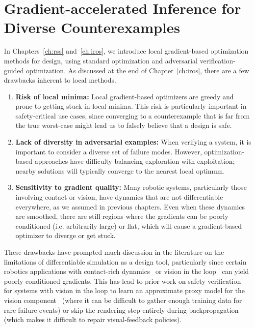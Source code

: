\chapter{Gradient-accelerated Inference for Diverse Counterexamples}\label{ch:corl}

In Chapters~\ref{ch:rss} and~\ref{ch:iros}, we introduce local gradient-based optimization methods for design, using standard optimization and adversarial verification-guided optimization. As discussed at the end of Chapter~\ref{ch:iros}, there are a few drawbacks inherent to local methods.

\begin{enumerate}
    \item \textbf{Risk of local minima: } Local gradient-based optimizers are greedy and prone to getting stuck in local minima. This risk is particularly important in safety-critical use cases, since converging to a counterexample that is far from the true worst-case might lead us to falsely believe that a design is safe.
    \item \textbf{Lack of diversity in adversarial examples: } When verifying a system, it is important to consider a diverse set of failure modes. However, optimization-based approaches have difficulty balancing exploration with exploitation; nearby solutions will typically converge to the nearest local optimum.
    \item \textbf{Sensitivity to gradient quality: } Many robotic systems, particularly those involving contact or vision, have dynamics that are not differentiable everywhere, as we assumed in previous chapters. Even when these dynamics are smoothed, there are still regions where the gradients can be poorly conditioned (i.e. arbitrarily large) or flat, which will cause a gradient-based optimizer to diverge or get stuck.
\end{enumerate}

These drawbacks have prompted much discussion in the literature on the limitations of differentiable simulation as a design tool, particularly since certain robotics applications with contact-rich dynamics~\cite{suhDifferentiableSimulatorsGive2022,metzGradientsAreNot2022} or vision in the loop~\cite{zhaoPhysicsbasedDifferentiableRendering2020} can yield poorly conditioned gradients. This has lead to prior work on safety verification for systems with vision in the loop to learn an approximate proxy model for the vision component~\cite{sinhaNeuralBridgeSampling2020} (where it can be difficult to gather enough training data for rare failure events) or skip the rendering step entirely during backpropagation~\cite{hanselmannKINGGeneratingSafetyCritical2022a} (which makes it difficult to repair visual-feedback policies).

